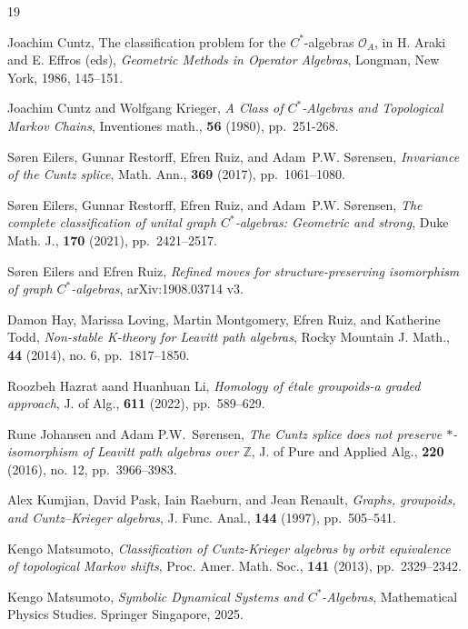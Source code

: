 \documentclass[11pt, letterpaper,final]{amsart}
\theoremstyle{definition}
\theoremstyle{remark}
\begin{document}
\begin{thebibliography}{19}

 Joachim Cuntz, The classification problem for the $C^*$-algebras $\mathcal{O}_A$, in H. Araki and E. Effros (eds), \emph{Geometric Methods in Operator Algebras}, Longman, New York, 1986, 145--151.

 Joachim Cuntz and Wolfgang Krieger, \emph{A Class of $C^*$-Algebras and Topological Markov Chains}, Inventiones math., \textbf{56} (1980), pp.~251-268.


  S{\o}ren Eilers, Gunnar Restorff, Efren Ruiz, and Adam~P.W. S{\o}rensen, \emph{Invariance of the Cuntz splice}, Math. Ann., \textbf{369} (2017), pp.~1061--1080.

 S{\o}ren Eilers, Gunnar Restorff, Efren Ruiz, and Adam~P.W. S{\o}rensen, \emph{The complete classification of unital graph {$C^*$}-algebras: Geometric and strong}, Duke Math. J., \textbf{170} (2021), pp.~2421--2517.

 S{\o}ren Eilers and Efren Ruiz, \emph{Refined moves for structure-preserving isomorphism of graph {$C^*$}-algebras}, arXiv:1908.03714 v3.

 Damon Hay, Marissa Loving, Martin Montgomery, Efren Ruiz, and Katherine Todd, \emph{Non-stable K-theory for Leavitt path algebras}, Rocky Mountain J. Math., \textbf{44} (2014), no. 6, pp.~1817--1850.

 Roozbeh Hazrat aand Huanhuan Li, \emph{Homology of \'{e}tale groupoids-a graded approach}, J. of Alg., \textbf{611} (2022), pp.~589--629.

 Rune Johansen and Adam P.W.~S{\o}rensen, \emph{The Cuntz splice does not preserve $*$-isomorphism of Leavitt path algebras over $\mathbb{Z}$}, J. of Pure and Applied Alg., \textbf{220} (2016), no. 12, pp.~3966--3983.


 Alex Kumjian, David Pask, Iain Raeburn, and Jean Renault, \emph{Graphs, groupoids, and Cuntz–Krieger algebras}, J. Func. Anal., \textbf{144} (1997), pp.~505--541.


 Kengo Matsumoto, \emph{Classification of Cuntz-Krieger algebras by orbit equivalence of topological Markov shifts}, Proc. Amer. Math. Soc., \textbf{141} (2013), pp.~2329--2342.

 Kengo Matsumoto, \emph{Symbolic Dynamical Systems and {$C^*$}-Algebras}, Mathematical Physics Studies. Springer Singapore, 2025.


\end{thebibliography}
\end{document}

